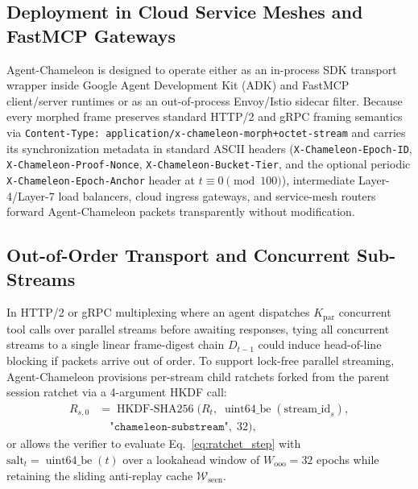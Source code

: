 \documentclass[conference,10pt]{IEEEtran}
\begin{document}
\subsection{Deployment in Cloud Service Meshes and FastMCP Gateways}
Agent-Chameleon is designed to operate either as an in-process SDK transport wrapper inside Google Agent Development Kit (ADK) and FastMCP client/server runtimes or as an out-of-process Envoy/Istio sidecar filter. Because every morphed frame preserves standard HTTP/2 and gRPC framing semantics via \texttt{Content-Type: application/x-chameleon-morph+octet-stream} and carries its synchronization metadata in standard ASCII headers (\texttt{X-Chameleon-Epoch-ID}, \texttt{X-Chameleon-Proof-Nonce}, \texttt{X-Chameleon-Bucket-Tier}, and the optional periodic \texttt{X-Chameleon-Epoch-Anchor} header at $t \equiv 0 \pmod{100}$), intermediate Layer-4/Layer-7 load balancers, cloud ingress gateways, and service-mesh routers forward Agent-Chameleon packets transparently without modification.

\subsection{Out-of-Order Transport and Concurrent Sub-Streams}
In HTTP/2 or gRPC multiplexing where an agent dispatches $K_{\text{par}}$ concurrent tool calls over parallel streams before awaiting responses, tying all concurrent streams to a single linear frame-digest chain $D_{t-1}$ could induce head-of-line blocking if packets arrive out of order. To support lock-free parallel streaming, Agent-Chameleon provisions per-stream child ratchets forked from the parent session ratchet via a 4-argument HKDF call:
\begin{equation}
\label{eq:child_ratchet}
\begin{aligned}
R_{s, 0} &= \operatorname{HKDF-SHA256}\big(R_t,\; \operatorname{uint64\_be}(\text{stream\_id}_s), \\
&\quad \texttt{"chameleon-substream"},\; 32\big),
\end{aligned}
\end{equation}
or allows the verifier to evaluate Eq.~\eqref{eq:ratchet_step} with $\text{salt}_t = \operatorname{uint64\_be}(t)$ over a lookahead window of $W_{\text{ooo}} = 32$ epochs while retaining the sliding anti-replay cache $\mathcal{W}_{\text{seen}}$.
\end{document}
